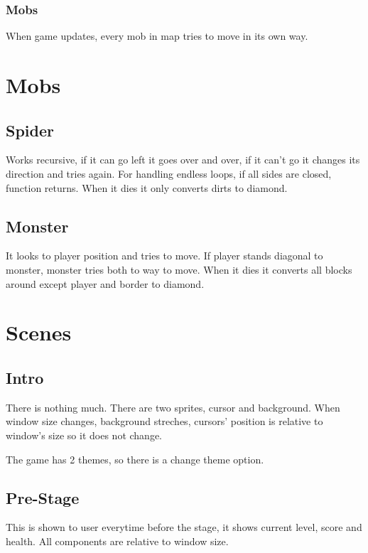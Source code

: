 \documentclass[letterpaper,10pt,english]{sphinxmanual}
\begin{document}
\subsubsection{Mobs}
\label{\detokenize{player:mobs}}
When game updates, every mob in map tries to move in its own way.


\section{Mobs}
\label{\detokenize{mobs:mobs}}\label{\detokenize{mobs::doc}}

\subsection{Spider}
\label{\detokenize{mobs:spider}}
Works recursive, if it can go left it goes over and over, if it can’t go it changes
its direction and tries again. For handling endless loops, if all sides are closed,
function returns.
When it dies it only converts dirts to diamond.


\subsection{Monster}
\label{\detokenize{mobs:monster}}
It looks to player position and tries to move. If player stands diagonal to monster,
monster tries both to way to move.
When it dies it converts all blocks around except player and border to diamond.


\section{Scenes}
\label{\detokenize{scenes:scenes}}\label{\detokenize{scenes::doc}}

\subsection{Intro}
\label{\detokenize{scenes:intro}}
There is nothing much. There are two sprites, cursor and background. When window size changes,
background streches, cursors’ position is relative to window’s size so it does not change.

The game has 2 themes, so there is a change theme option.


\subsection{Pre-Stage}
\label{\detokenize{scenes:pre-stage}}
This is shown to user everytime before the stage, it shows current level, score
and health. All components are relative to window size.
\end{document}
